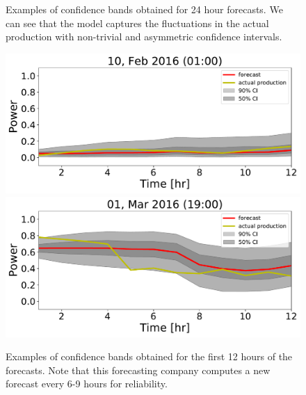 \documentclass[ima, 20pt, portrait, plainboxedsections]{sciposter}
\begin{document}
\begin{multicols}{3}
\begin{figure}[t]
\begin{center}
\end{center}
  \caption{ Examples of confidence bands obtained for 24 hour forecasts. We can see that the model captures the fluctuations in the actual production with non-trivial and asymmetric confidence intervals.}
\label{fig:72hr}
\end{figure}

\begin{figure}[t]
\begin{center}
  \includegraphics[width=0.8\linewidth]{confidence_intervals/12hr/75.pdf}
  \includegraphics[width=0.8\linewidth]{confidence_intervals/12hr/148.pdf}
\end{center}
  \caption{ Examples of confidence bands obtained for the first 12 hours of the forecasts. Note that this forecasting company computes a new forecast every 6-9 hours for reliability.}
\label{fig:6hr}
\end{figure}




\end{multicols}
\end{document}

